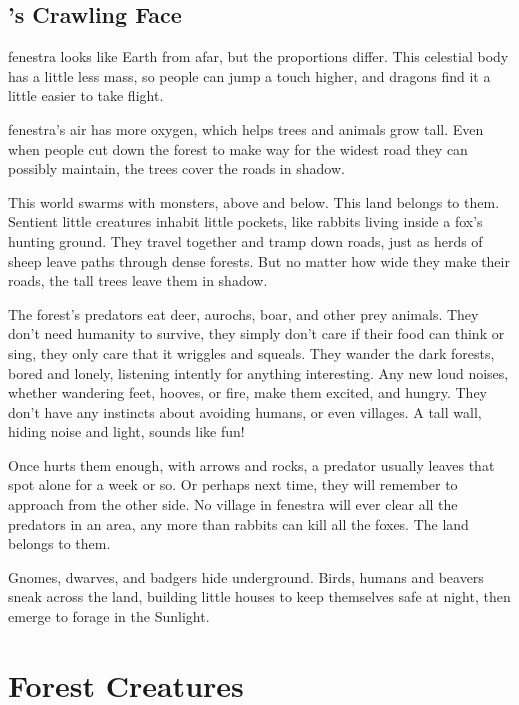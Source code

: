 \begin{multicols}{2}
\subsection{'s Crawling Face}

\Gls{fenestra} looks like Earth from afar, but the proportions differ.
This celestial body has a little less mass, so people can jump a touch higher, and dragons find it a little easier to take flight.

\Gls{fenestra}'s air has more oxygen, which helps trees and animals grow tall.
Even when people cut down the forest to make way for the widest road they can possibly maintain, the trees cover the roads in shadow.

This world swarms with monsters, above and below.
This land belongs to them.
Sentient little creatures inhabit little pockets, like rabbits living inside a fox's hunting ground.
They travel together and tramp down roads, just as herds of sheep leave paths through dense forests.
But no matter how wide they make their roads, the tall trees leave them in shadow.

The forest's predators eat deer, aurochs, boar, and other prey animals.
They don't need humanity to survive, they simply don't care if their food can think or sing, they only care that it wriggles and squeals.
They wander the dark forests, bored and lonely, listening intently for anything interesting.
Any new loud noises, whether wandering feet, hooves, or fire, make them excited, and hungry.
They don't have any instincts about avoiding humans, or even \glspl{village}.
A tall wall, hiding noise and light, sounds like fun!

Once  hurts them enough, with arrows and rocks, a predator usually leaves that spot alone for a week or so.
Or perhaps next time, they will remember to approach from the other side.
No \gls{village} in \gls{fenestra} will ever clear all the predators in an area, any more than rabbits can kill all the foxes.
The land belongs to them.

Gnomes, dwarves, and badgers hide underground.
Birds, humans and beavers sneak across the land, building little houses to keep themselves safe at night, then emerge to forage in the Sunlight.

\end{multicols}

\section[Forest Creatures]{Forest Creatures \A}

